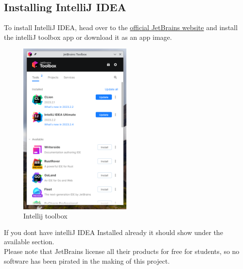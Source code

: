 \documentclass[]{report}
\begin{document}
	\subsection{Installing IntelliJ IDEA}
	To install IntelliJ IDEA, head over to the \href{https://www.jetbrains.com/toolbox-app/}{official JetBrains website} and install the intelliJ toolbox app or download it as an app image.\\
	\begin{figure}[!htb]
		\centering
		\includegraphics[width=0.5\textwidth]{intellij_toolbox.png}
		\caption{Intellij toolbox}
	\end{figure}

	If you dont have intelliJ IDEA Installed already it should show under the available section.\\
	Please note that JetBrains license all their products for free for students, so no software has been pirated in the making of this project.
	\newpage
\end{document}
